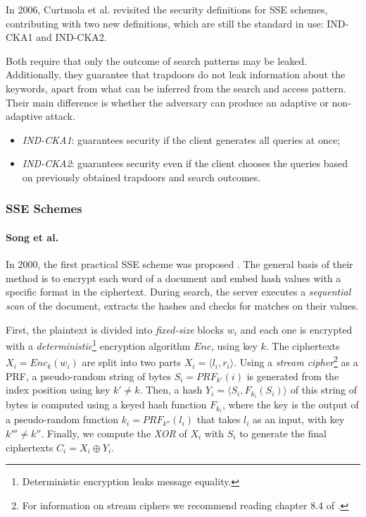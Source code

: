 In 2006, Curtmola et al. \autocite{Curtmola2011-hi} revisited the security definitions for \gls{SSE} schemes, contributing with two new definitions, which are still the standard in use: \gls{IND-CKA1} and \gls{IND-CKA2}. 

Both require that only the outcome of search patterns may be leaked. Additionally, they guarantee that trapdoors do not leak information about the keywords, apart from what can be inferred from the search and access pattern. Their main difference is whether the adversary can produce an adaptive or non-adaptive attack.

\begin{itemize}
    \item \emph{IND-CKA1}: guarantees security if the client generates all queries at once;
    \item \emph{IND-CKA2}: guarantees security even if the client chooses the queries based on previously obtained trapdoors and search outcomes.
\end{itemize}

\subsubsection{SSE Schemes}

\paragraph{Song et al.} In 2000, the first practical \gls{SSE} scheme was proposed \autocite{Song2000-ir}. The general basis of their method is to encrypt each word of a document and embed hash values with a specific format in the ciphertext. During search, the server executes a \emph{sequential scan} of the document, extracts the hashes and checks for matches on their values. 

First, the plaintext is divided into \emph{fixed-size} blocks $w_i$ and each one is encrypted with a \emph{deterministic}\footnote{Deterministic encryption leaks  message  equality.} encryption algorithm $Enc$, using key $k$. The ciphertexts $X_{i} = Enc_{k}(w_{i})$ are split into two parts $X_{i}=\langle l_{i},r_{i}\rangle$. Using a \emph{stream cipher}\footnote{For information on stream ciphers we recommend reading chapter 8.4 of \autocite{Pearson2017-ve}.} as a \gls{PRF}, a pseudo-random string of bytes $S_{i}=PRF_{k'}(i)$ is generated from the index position using key $k' \neq k$. Then, a hash $Y_{i} = \langle S_{i},F_{k_{i}}(S_{i})\rangle$ of this string of bytes is computed using a keyed hash function $F_{k_{i}}$, where the key is the output of a pseudo-random function $k_{i}=PRF_{k''}(l_{i})$ that takes $l_{i}$ as an input, with key $k''' \neq k''$. Finally, we compute the \emph{XOR} of $X_{i}$ with $S_{i}$ to generate the final ciphertexts $C_{i} = X_{i} \oplus Y_{i}$.

